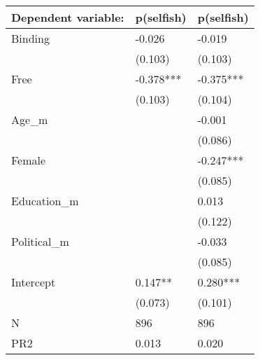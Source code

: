 \begin{tabular}{lll}
\toprule
Dependent variable: & p(selfish) & p(selfish) \\
\midrule
Binding     &     -0.026 &     -0.019 \\
            &    (0.103) &    (0.103) \\
Free        &  -0.378*** &  -0.375*** \\
            &    (0.103) &    (0.104) \\
Age\_m       &            &     -0.001 \\
            &            &    (0.086) \\
Female      &            &  -0.247*** \\
            &            &    (0.085) \\
Education\_m &            &      0.013 \\
            &            &    (0.122) \\
Political\_m &            &     -0.033 \\
            &            &    (0.085) \\
Intercept   &    0.147** &   0.280*** \\
            &    (0.073) &    (0.101) \\
N           &        896 &        896 \\
PR2         &      0.013 &      0.020 \\
\bottomrule
\end{tabular}
